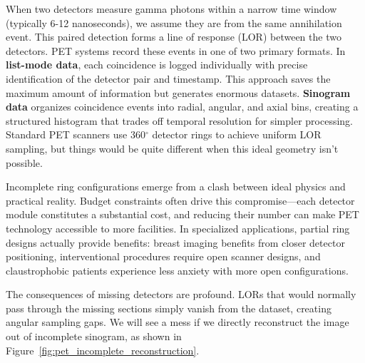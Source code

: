 \documentclass[12pt]{iopart}
\begin{document}
When two detectors measure gamma photons within a narrow time window (typically 6-12 nanoseconds), we assume they are from the same annihilation event. This paired detection forms a line of response (LOR) between the two detectors.
PET systems record these events in one of two primary formats. In \textbf{list-mode data}, each coincidence is logged individually with precise identification of the detector pair and timestamp. This approach saves the maximum amount of information but generates enormous datasets. \textbf{Sinogram data} organizes coincidence events into radial, angular, and axial bins, creating a structured histogram that trades off temporal resolution for simpler processing. Standard PET scanners use 360$^\circ$ detector rings to achieve uniform LOR sampling, but things would be quite different when this ideal geometry isn't possible.






Incomplete ring configurations emerge from a clash between ideal physics and practical reality. Budget constraints often drive this compromise—each detector module constitutes a substantial cost, and reducing their number can make PET technology accessible to more facilities. In specialized applications, partial ring designs actually provide benefits: breast imaging benefits from closer detector positioning, interventional procedures require open scanner designs, and claustrophobic patients experience less anxiety with more open configurations.





The consequences of missing detectors are profound. 
LORs that would normally pass through the missing sections simply vanish from the dataset, creating angular sampling gaps. We will see a mess if we directly reconstruct the image out of incomplete sinogram, as shown in Figure~\ref{fig:pet_incomplete_reconstruction}.
\end{document}
